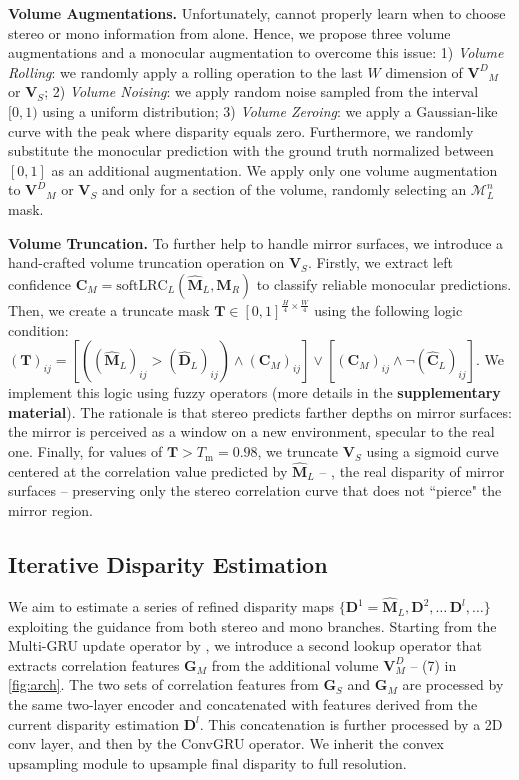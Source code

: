\textbf{Volume Augmentations.} Unfortunately, \method cannot properly learn when to choose stereo or mono information from \cite{mayer2016large} alone.
Hence, we propose three volume augmentations and a monocular augmentation to overcome this issue: 1) \textit{Volume Rolling}: we randomly apply a rolling operation to the last $W$ dimension of ${\mathbf{V}^D}_M$ or ${\mathbf{V}}_S$; 2) \textit{Volume Noising}: we apply random noise sampled from the interval $[0,1)$ using a uniform distribution; 3) \textit{Volume Zeroing}: we apply a Gaussian-like curve with the peak where disparity equals zero. Furthermore, we randomly substitute the monocular prediction with the ground truth normalized between $[0,1]$ as an additional augmentation.
We apply only one volume augmentation to ${\mathbf{V}^D}_M$ or ${\mathbf{V}}_S$ and only for a section of the volume, randomly selecting an $\mathcal{M}_L^n$ mask.

\textbf{Volume Truncation.} To further help \method to handle mirror surfaces, we introduce a hand-crafted volume truncation operation on ${\mathbf{V}}_S$. Firstly, we extract left confidence $\mathbf{C}_M=\text{softLRC}_L(\hat{\mathbf{M}}_L, \hat{\mathbf{M}}_R)$ to classify reliable monocular predictions. Then, we create a truncate mask $\mathbf{T} \in [0,1]^{\frac{H}{4} \times \frac{W}{4}}$ using the following logic condition: $(\mathbf{T})_{ij}=\left[\left((\hat{\mathbf{M}}_L)_{ij} >(\hat{\mathbf{D}}_L)_{ij}\right) \land (\mathbf{C}_M)_{ij} \right] \lor \left[ (\mathbf{C}_M)_{ij} \land \neg(\hat{\mathbf{C}}_L)_{ij} \right]$.
We implement this logic using fuzzy operators (more details in the \textbf{supplementary material}).
The rationale is that stereo predicts farther depths on mirror surfaces: the mirror is perceived as a window on a new environment, specular to the real one.
Finally, for values of $\mathbf{T}>T_\text{m}=0.98$, we truncate ${\mathbf{V}_S}$ using a sigmoid curve centered at the correlation value predicted by $\hat{\mathbf{M}}_L$ -- \ie, the real disparity of mirror surfaces -- preserving only the stereo correlation curve that does not ``pierce" the mirror region.

\subsection{Iterative Disparity Estimation}

We aim to estimate a series of refined disparity maps $\{\mathbf{D}^1=\hat{\mathbf{M}}_L, \mathbf{D}^2,\dots\,\mathbf{D}^l,\dots\}$ exploiting the guidance from both stereo and mono branches. 
Starting from the Multi-GRU update operator by \cite{lipson2021raft}, we introduce a second lookup operator that extracts correlation features $\mathbf{G}_M$ from the additional volume $\mathbf{V}^D_M$ -- (7) in \cref{fig:arch}.
The two sets of correlation features from $\mathbf{G}_S$ and $\mathbf{G}_M$ are processed by the same two-layer encoder and concatenated with features derived from the current disparity estimation $\mathbf{D}^l$. This concatenation is further processed by a 2D conv layer, and then by the ConvGRU operator.
We inherit the convex upsampling module \cite{lipson2021raft} to upsample final disparity to full resolution.

